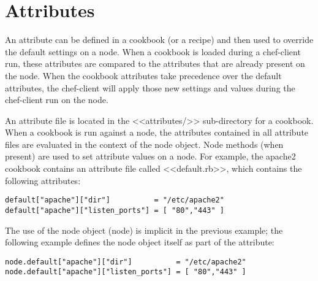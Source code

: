 \section{Attributes}

An attribute can be defined in a cookbook (or a recipe) and then used to override the default settings on a node. When a cookbook is loaded during a chef-client run, these attributes are compared to the attributes that are already present on the node. When the cookbook attributes take precedence over the default attributes, the chef-client will apply those new settings and values during the chef-client run on the node.

An attribute file is located in the <<attributes/>> sub-directory for a cookbook. When a cookbook is run against a node, the attributes contained in all attribute files are evaluated in the context of the node object. Node methods (when present) are used to set attribute values on a node. For example, the apache2 cookbook contains an attribute file called <<default.rb>>, which contains the following attributes:

\begin{lstlisting}[label=lst:cookbook-attributes1]
default["apache"]["dir"]          = "/etc/apache2"
default["apache"]["listen_ports"] = [ "80","443" ]
\end{lstlisting}

The use of the node object (node) is implicit in the previous example; the following example defines the node object itself as part of the attribute:

\begin{lstlisting}[label=lst:cookbook-attributes2]
node.default["apache"]["dir"]          = "/etc/apache2"
node.default["apache"]["listen_ports"] = [ "80","443" ]
\end{lstlisting}
